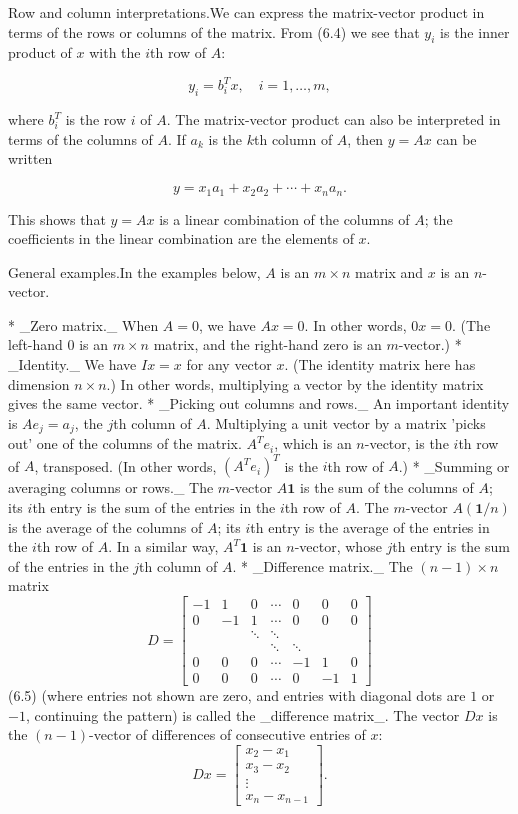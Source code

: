 
Row and column interpretations.We can express the matrix-vector product in terms of the rows or columns of the matrix. From (6.4) we see that \(y_{i}\) is the inner product of \(x\) with the \(i\)th row of \(A\):

\[y_{i}=b_{i}^{T}x,\quad i=1,\ldots,m,\]

where \(b_{i}^{T}\) is the row \(i\) of \(A\). The matrix-vector product can also be interpreted in terms of the columns of \(A\). If \(a_{k}\) is the \(k\)th column of \(A\), then \(y=Ax\) can be written

\[y=x_{1}a_{1}+x_{2}a_{2}+\cdots+x_{n}a_{n}.\]

This shows that \(y=Ax\) is a linear combination of the columns of \(A\); the coefficients in the linear combination are the elements of \(x\).

General examples.In the examples below, \(A\) is an \(m\times n\) matrix and \(x\) is an \(n\)-vector.

* _Zero matrix._ When \(A=0\), we have \(Ax=0\). In other words, \(0x=0\). (The left-hand \(0\) is an \(m\times n\) matrix, and the right-hand zero is an \(m\)-vector.)
* _Identity._ We have \(Ix=x\) for any vector \(x\). (The identity matrix here has dimension \(n\times n\).) In other words, multiplying a vector by the identity matrix gives the same vector.
* _Picking out columns and rows._ An important identity is \(Ae_{j}=a_{j}\), the \(j\)th column of \(A\). Multiplying a unit vector by a matrix 'picks out' one of the columns of the matrix. \(A^{T}e_{i}\), which is an \(n\)-vector, is the \(i\)th row of \(A\), transposed. (In other words, \((A^{T}e_{i})^{T}\) is the \(i\)th row of \(A\).)
* _Summing or averaging columns or rows._ The \(m\)-vector \(A\mathbf{1}\) is the sum of the columns of \(A\); its \(i\)th entry is the sum of the entries in the \(i\)th row of \(A\). The \(m\)-vector \(A(\mathbf{1}/n)\) is the average of the columns of \(A\); its \(i\)th entry is the average of the entries in the \(i\)th row of \(A\). In a similar way, \(A^{T}\mathbf{1}\) is an \(n\)-vector, whose \(j\)th entry is the sum of the entries in the \(j\)th column of \(A\).
* _Difference matrix._ The \((n-1)\times n\) matrix \[D=\left[\begin{array}{ccccccc}-1&1&0&\cdots&0&0&0\\ 0&-1&1&\cdots&0&0&0\\ &&\ddots&\ddots&&\\ &&&\ddots&\ddots&&\\ 0&0&0&\cdots&-1&1&0\\ 0&0&0&\cdots&0&-1&1\end{array}\right]\] (6.5) (where entries not shown are zero, and entries with diagonal dots are \(1\) or \(-1\), continuing the pattern) is called the _difference matrix_. The vector \(Dx\) is the \((n-1)\)-vector of differences of consecutive entries of \(x\): \[Dx=\left[\begin{array}{c}x_{2}-x_{1}\\ x_{3}-x_{2}\\ \vdots\\ x_{n}-x_{n-1}\end{array}\right].\] 
